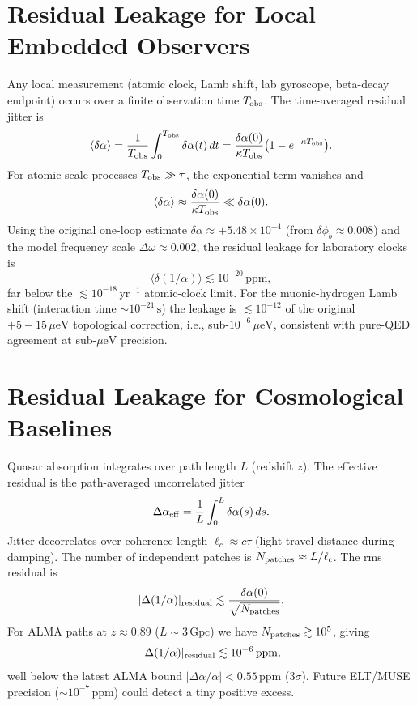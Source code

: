 \documentclass[11pt]{article}
\begin{document}
\section{Residual Leakage for Local Embedded Observers}

Any local measurement (atomic clock, Lamb shift, lab gyroscope, beta-decay endpoint) occurs over a finite observation time \(T_{\rm obs}\). The time-averaged residual jitter is
\[
\langle\delta\alpha\rangle=\frac{1}{T_{\rm obs}}\int_0^{T_{\rm obs}}\delta\alpha(t)\,dt=\frac{\delta\alpha(0)}{\kappa T_{\rm obs}}\bigl(1-e^{-\kappa T_{\rm obs}}\bigr).
\]
For atomic-scale processes \(T_{\rm obs}\gg\tau\), the exponential term vanishes and
\[
\langle\delta\alpha\rangle\approx\frac{\delta\alpha(0)}{\kappa T_{\rm obs}}\ll\delta\alpha(0).
\]
Using the original one-loop estimate \(\delta\alpha\approx+5.48\times10^{-4}\) (from \(\delta\phi_b\approx0.008\)) and the model frequency scale \(\Delta\omega\approx0.002\), the residual leakage for laboratory clocks is
\[
\langle\delta(1/\alpha)\rangle\lesssim10^{-20}\,\text{ppm},
\]
far below the \(\lesssim10^{-18}\,\text{yr}^{-1}\) atomic-clock limit. For the muonic-hydrogen Lamb shift (interaction time \(\sim10^{-21}\,\text{s}\)) the leakage is \(\lesssim10^{-12}\) of the original \(+5{-}15\,\mu\text{eV}\) topological correction, i.e., sub-\(10^{-6}\,\mu\text{eV}\), consistent with pure-QED agreement at sub-\(\mu\text{eV}\) precision.

\section{Residual Leakage for Cosmological Baselines}

Quasar absorption integrates over path length \(L\) (redshift \(z\)). The effective residual is the path-averaged uncorrelated jitter
\[
\Delta\alpha_{\rm eff}=\frac{1}{L}\int_0^L\delta\alpha(s)\,ds.
\]
Jitter decorrelates over coherence length \(\ell_c\approx c\tau\) (light-travel distance during damping). The number of independent patches is \(N_{\rm patches}\approx L/\ell_c\). The rms residual is
\[
|\Delta(1/\alpha)|_{\rm residual}\lesssim\frac{\delta\alpha(0)}{\sqrt{N_{\rm patches}}}.
\]
For ALMA paths at \(z\approx0.89\) (\(L\sim3\,\text{Gpc}\)) we have \(N_{\rm patches}\gtrsim10^5\), giving
\[
|\Delta(1/\alpha)|_{\rm residual}\lesssim10^{-6}\,\text{ppm},
\]
well below the latest ALMA bound \(|\Delta\alpha/\alpha|<0.55\,\text{ppm}\) (3\(\sigma\)). Future ELT/MUSE precision (\(\sim10^{-7}\,\text{ppm}\)) could detect a tiny positive excess.
\end{document}
